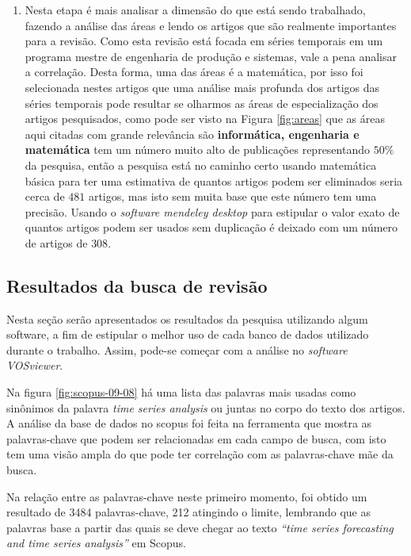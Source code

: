 \begin{enumerate}[start=1, label = {\textbf{Etapa} \arabic* } ]
\item  \label{etp:rev-4}Nesta etapa é mais analisar a dimensão do que está sendo trabalhado, fazendo a análise das áreas e lendo os artigos que são realmente importantes para a revisão. Como esta revisão está focada em séries temporais em um programa mestre de engenharia de produção e sistemas, vale a pena analisar a correlação. Desta forma, uma das áreas é a matemática, por isso foi selecionada nestes artigos que uma análise mais profunda dos artigos das séries temporais pode resultar se olharmos as áreas de especialização dos artigos pesquisados, como pode ser visto na Figura \ref{fig:areas} que as áreas aqui citadas com grande relevância são \textbf{informática, engenharia e matemática} tem um número muito alto de publicações representando $50\%$ da pesquisa, então a pesquisa está no caminho certo usando matemática básica para ter uma estimativa de quantos artigos podem ser eliminados seria cerca de $481$ artigos, mas isto sem muita base que este número tem uma precisão. Usando o \textit{software mendeley desktop} para estipular o valor exato de quantos artigos podem ser usados sem duplicação é deixado com um número de artigos de $308$.
\end{enumerate}

\subsection{Resultados da busca de revis\~ao}\label{subesec:resul da revisão}


Nesta seção serão apresentados os resultados da pesquisa utilizando algum software, a fim de estipular o melhor uso de cada banco de dados utilizado durante o trabalho. Assim, pode-se começar com a análise no \textit{software VOSviewer}. 


Na figura \ref{fig:scopus-09-08} há uma lista das palavras mais usadas como sinônimos da palavra \textit{time series analysis} ou juntas no corpo do texto dos artigos.
A análise da base de dados no scopus foi feita na ferramenta que mostra as palavras-chave que podem ser relacionadas em cada campo de busca, com isto tem uma visão ampla do que pode ter correlação com as palavras-chave mãe da busca.

Na relação entre as palavras-chave neste primeiro momento, foi obtido um resultado de 3484 palavras-chave, 212 atingindo o limite, lembrando que as palavras base a partir das quais se deve chegar ao texto \textit{``time series forecasting and time series analysis''} em Scopus.



